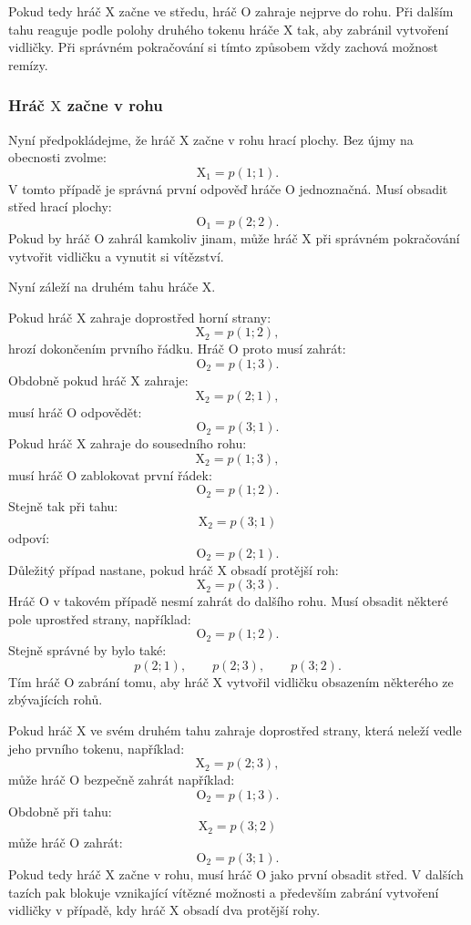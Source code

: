 \documentclass[12pt,a4paper]{article}
\begin{document}
Pokud tedy hráč $\mathrm{X}$ začne ve středu, hráč $\mathrm{O}$ zahraje nejprve do rohu.
Při dalším tahu reaguje podle polohy druhého tokenu hráče $\mathrm{X}$ tak, 
aby zabránil vytvoření vidličky.
Při správném pokračování si tímto způsobem vždy zachová možnost remízy.

\subsubsection*{Hráč $\mathrm{X}$ začne v rohu}
Nyní předpokládejme, že hráč $\mathrm{X}$ začne v rohu hrací plochy.
Bez újmy na obecnosti zvolme:
\[
    \mathrm{X}_1=p(1;1).
\]
V tomto případě je správná první odpověď hráče $\mathrm{O}$ jednoznačná.
Musí obsadit střed hrací plochy:
\[
    \mathrm{O}_1=p(2;2).
\]
Pokud by hráč $\mathrm{O}$ zahrál kamkoliv jinam, 
může hráč $\mathrm{X}$ při správném pokračování vytvořit vidličku a vynutit si vítězství.

Nyní záleží na druhém tahu hráče $\mathrm{X}$.

Pokud hráč $\mathrm{X}$ zahraje doprostřed horní strany:
\[
    \mathrm{X}_2=p(1;2),
\]
hrozí dokončením prvního řádku.
Hráč $\mathrm{O}$ proto musí zahrát:
\[
    \mathrm{O}_2=p(1;3).
\]
Obdobně pokud hráč $\mathrm{X}$ zahraje:
\[
    \mathrm{X}_2=p(2;1),
\]
musí hráč $\mathrm{O}$ odpovědět:
\[
    \mathrm{O}_2=p(3;1).
\]
Pokud hráč $\mathrm{X}$ zahraje do sousedního rohu:
\[
    \mathrm{X}_2=p(1;3),
\]
musí hráč $\mathrm{O}$ zablokovat první řádek:
\[
    \mathrm{O}_2=p(1;2).
\]
Stejně tak při tahu:
\[
    \mathrm{X}_2=p(3;1)
\]
odpoví:
\[
    \mathrm{O}_2=p(2;1).
\]
Důležitý případ nastane, pokud hráč $\mathrm{X}$ obsadí protější roh:
\[
    \mathrm{X}_2=p(3;3).
\]
Hráč $\mathrm{O}$ v takovém případě nesmí zahrát do dalšího rohu.
Musí obsadit některé pole uprostřed strany, například:
\[
    \mathrm{O}_2=p(1;2).
\]
Stejně správné by bylo také:
\[
    p(2;1),\qquad p(2;3),\qquad p(3;2).
\]
Tím hráč $\mathrm{O}$ zabrání tomu, 
aby hráč $\mathrm{X}$ vytvořil vidličku obsazením některého ze zbývajících rohů.

Pokud hráč $\mathrm{X}$ ve svém druhém tahu zahraje doprostřed strany, 
která neleží vedle jeho prvního tokenu, například:
\[
    \mathrm{X}_2=p(2;3),
\]
může hráč $\mathrm{O}$ bezpečně zahrát například:
\[
    \mathrm{O}_2=p(1;3).
\]
Obdobně při tahu:
\[
    \mathrm{X}_2=p(3;2)
\]
může hráč $\mathrm{O}$ zahrát:
\[
    \mathrm{O}_2=p(3;1).
\]
Pokud tedy hráč $\mathrm{X}$ začne v rohu, 
musí hráč $\mathrm{O}$ jako první obsadit střed.
V dalších tazích pak blokuje vznikající vítězné možnosti 
a především zabrání vytvoření vidličky v případě, 
kdy hráč $\mathrm{X}$ obsadí dva protější rohy.
\end{document}
